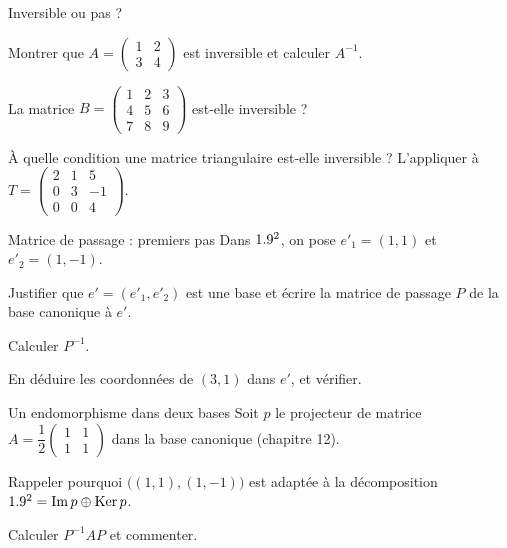 \begin{exercice}[1]{Inversible ou pas ?}
\begin{questions}
  \item Montrer que $A=\begin{pmatrix}1&2\\3&4\end{pmatrix}$ est
    inversible et calculer $A^{-1}$.
  \item La matrice $B=\begin{pmatrix}1&2&3\\4&5&6\\7&8&9\end{pmatrix}$
    est-elle inversible ?
  \item À quelle condition une matrice triangulaire est-elle inversible ?
    L'appliquer à $T=\begin{pmatrix}2&1&5\\0&3&-1\\0&0&4\end{pmatrix}$.
\end{questions}
\end{exercice}

\begin{exercice}[1]{Matrice de passage : premiers pas}
Dans $1.9^{2}$, on pose $e'_1=(1,1)$ et $e'_2=(1,-1)$.
\begin{questions}
  \item Justifier que $e'=(e'_1,e'_2)$ est une base et écrire la matrice
    de passage $P$ de la base canonique à $e'$.
  \item Calculer $P^{-1}$.
  \item En déduire les coordonnées de $(3,1)$ dans $e'$, et vérifier.
\end{questions}
\end{exercice}

\begin{exercice}[1]{Un endomorphisme dans deux bases}
Soit $p$ le projecteur de matrice
$A=\dfrac12\begin{pmatrix}1&1\\1&1\end{pmatrix}$ dans la base canonique
(chapitre 12).
\begin{questions}
  \item Rappeler pourquoi $\bigl((1,1),(1,-1)\bigr)$ est adaptée à la
    décomposition $1.9^{2}=\operatorname{Im}p\oplus\operatorname{Ker}p$.
  \item Calculer $P^{-1}AP$ et commenter.
\end{questions}
\end{exercice}

